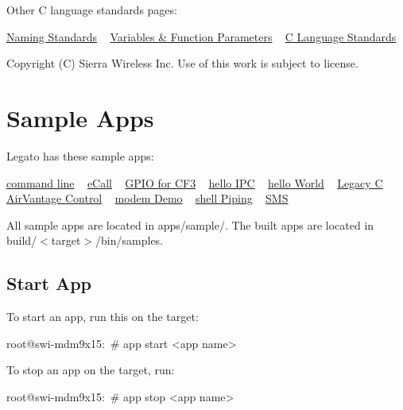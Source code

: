 Other C language standards\textquotesingle{} pages\+:

\hyperlink{ccodingStdsNaming}{Naming Standards} ~\newline
 \hyperlink{ccodingStdsParam}{Variables \& Function Parameters} ~\newline
 \hyperlink{ccodingStdsMain}{C Language Standards}





Copyright (C) Sierra Wireless Inc. Use of this work is subject to license. \hypertarget{sampleApps}{}\section{Sample Apps}\label{sampleApps}
Legato has these sample apps\+:

\hyperlink{sampleApps_commandLine}{command line} ~\newline
 \hyperlink{sampleApps_eCall}{e\+Call} ~\newline
 \hyperlink{sampleApps_gpioCf3}{G\+P\+I\+O for C\+F3} ~\newline
 \hyperlink{sampleApps_helloIpc}{hello I\+P\+C} ~\newline
 \hyperlink{sampleApps_helloWorld}{hello World} ~\newline
 \hyperlink{sampleApps_legacy}{Legacy C} ~\newline
 \hyperlink{sampleApps_AV}{Air\+Vantage Control} ~\newline
 \hyperlink{sampleApps_modemDemo}{modem Demo} ~\newline
 \hyperlink{sampleApps_shellPiping}{shell Piping} ~\newline
 \hyperlink{sampleApps_sms}{S\+M\+S}

All sample apps are located in {\ttfamily apps/sample/}. The built apps are located in {\ttfamily build/$<$target$>$/bin/samples}.\hypertarget{sample_apps_sampleApps_startApp}{}\subsection{Start App}\label{sample_apps_sampleApps_startApp}
To start an app, run this on the target\+:

\begin{DoxyVerb}root@swi-mdm9x15:~# app start <app name>
\end{DoxyVerb}


To stop an app on the target, run\+: \begin{DoxyVerb}root@swi-mdm9x15:~# app stop <app name>
\end{DoxyVerb}



